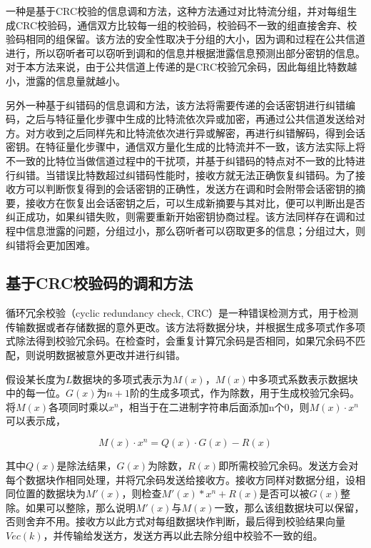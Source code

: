 一种是基于CRC校验的信息调和方法，这种方法通过对比特流分组，并对每组生成CRC校验码，通信双方比较每一组的校验码，校验码不一致的组直接舍弃、校验码相同的组保留。该方法的安全性取决于分组的大小，因为调和过程在公共信道进行，所以窃听者可以窃听到调和的信息并根据泄露信息预测出部分密钥的信息。对于本方法来说，由于公共信道上传递的是CRC校验冗余码，因此每组比特数越小，泄露的信息量就越小。

另外一种基于纠错码的信息调和方法，该方法将需要传递的会话密钥进行纠错编码，之后与特征量化步骤中生成的比特流依次异或加密，再通过公共信道发送给对方。对方收到之后同样先和比特流依次进行异或解密，再进行纠错解码，得到会话密钥。在特征量化步骤中，通信双方量化生成的比特流并不一致，该方法实际上将不一致的比特位当做信道过程中的干扰项，并基于纠错码的特点对不一致的比特进行纠错。当错误比特数超过纠错码性能时，接收方就无法正确恢复纠错码。为了接收方可以判断恢复得到的会话密钥的正确性，发送方在调和时会附带会话密钥的摘要，接收方在恢复出会话密钥之后，可以生成新摘要与其对比，便可以判断出是否纠正成功，如果纠错失败，则需要重新开始密钥协商过程。该方法同样存在调和过程中信息泄露的问题，分组过小，那么窃听者可以窃取更多的信息；分组过大，则纠错将会更加困难\cite{李古月2014无线信道的密钥生成方法}。

\subsection{基于CRC校验码的调和方法}

循环冗余校验（cyclic redundancy check, CRC）是一种错误检测方式，用于检测传输数据或者存储数据的意外更改。该方法将数据分块，并根据生成多项式作多项式除法得到校验冗余码。在检查时，会重复计算冗余码是否相同，如果冗余码不匹配，则说明数据被意外更改并进行纠错。

假设某长度为$L$数据块的多项式表示为$M(x)$，$M(x)$中多项式系数表示数据块中的每一位。$G(x)$为$n+1阶$的生成多项式，作为除数，用于生成校验冗余码。将$M(x)$各项同时乘以$x^n$，相当于在二进制字符串后面添加n个0，则$M(x) \cdot x^n$可以表示成，

\begin{equation}
    M(x) \cdot x^n = Q(x) \cdot G(x) - R(x) 
\end{equation}

其中$Q(x)$是除法结果，$G(x)$为除数，$R(x)$即所需校验冗余码。发送方会对每个数据块作相同处理，并将冗余码发送给接收方。接收方同样对数据分组，设相同位置的数据块为$M'(x)$，则检查$M'(x) * x^n + R(x)$是否可以被$G(x)$整除。如果可以整除，那么说明$M'(x)$与$M(x)$一致，那么该组数据块可以保留，否则舍弃不用。接收方以此方式对每组数据块作判断，最后得到校验结果向量$Vec(k)$，并传输给发送方，发送方再以此去除分组中校验不一致的组。

